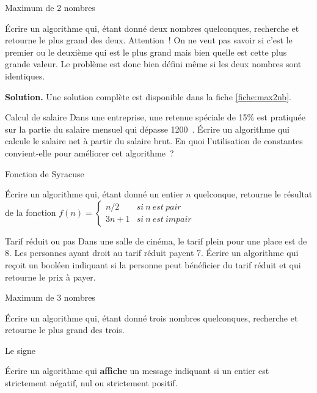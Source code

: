 	\begin{Exercice}{Maximum de 2 nombres}

		Écrire un algorithme qui, étant donné deux nombres quelconques,
		recherche et retourne le plus grand des deux. Attention~! On ne veut
		pas savoir si c’est le premier ou le deuxième qui est
		le plus grand mais bien quelle est cette plus grande valeur. Le
		problème est donc bien défini même si les deux nombres sont
		identiques.

		\textbf{Solution.}
		Une solution complète est disponible dans la fiche \vref{fiche:max2nb}.
	\end{Exercice}

	\begin{Exercice}{Calcul de salaire}
		Dans une entreprise, 
		une retenue spéciale de 15\% est pratiquée 
		sur la partie du salaire mensuel qui dépasse 1200~\texteuro. 
		Écrire un algorithme qui calcule le salaire net à partir du salaire brut. 
		En quoi l’utilisation de constantes convient-elle pour améliorer cet algorithme~?
	\end{Exercice}

	\begin{Exercice}{Fonction de Syracuse}

		Écrire un algorithme qui, étant donné un entier $n$ quelconque,
		retourne le résultat de la fonction
		$f(n)=
		\left\{
			\begin{array}{rl}
				n/2 & si \ n \ est\ pair\\
				3n+1 & si \ n \ est \ impair
			\end{array}
			\right.$
		\end{Exercice}

		\begin{Exercice}{Tarif réduit ou pas}
			Dans une salle de cinéma,
			le tarif plein pour une place est de 8\texteuro{}.
			Les personnes ayant droit au tarif réduit payent 7\texteuro{}.
			Écrire un algorithme qui reçoit un booléen
			indiquant si la personne peut bénéficier du tarif réduit
			et qui retourne le prix à payer.
		\end{Exercice}

		\begin{Exercice}{Maximum de 3 nombres}

			Écrire un algorithme qui, étant donné trois nombres quelconques,
			recherche et retourne le plus grand des trois.
		\end{Exercice}

		\begin{Exercice}{Le signe}

			Écrire un algorithme qui \textbf{affiche} un message indiquant
			si un entier est strictement négatif, nul ou strictement
			positif.
		\end{Exercice}

